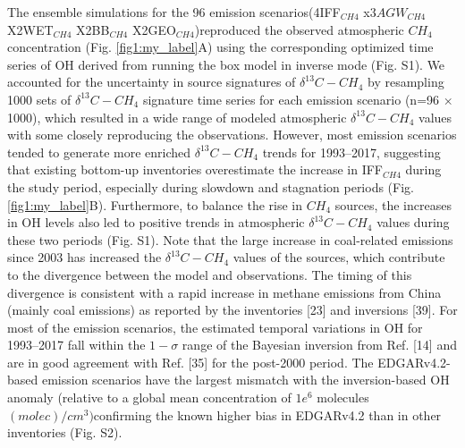 \documentclass[a4paper,12pt]{article}
\begin{document}
\small{The ensemble simulations for the 96 emission scenarios(4IFF$_{CH4}$ x3$AGW_{CH4}$ X2WET$_{CH4}$ X2BB$_{CH4}$ X2GEO$_{CH4}$)reproduced the observed atmospheric $CH_{4}$ concentration (Fig. \ref{fig1:my_label}A) using the corresponding optimized time series of OH derived from running the box model in inverse mode (Fig. S1). We accounted for the uncertainty in source signatures of $\delta^{13}$$C-CH_{4}$ by resampling 1000 sets of $\delta^{13}$$C-CH_{4}$ signature time series for each emission scenario (n=96 × 1000), which resulted in a wide range of modeled atmospheric $\delta^{13}$$C-CH_{4}$ values with some closely reproducing the observations. However, most emission scenarios tended to generate more enriched $\delta^{13}$$C-CH_{4}$ trends for 1993–2017, suggesting that existing bottom-up inventories overestimate the increase in IFF$_{CH4}$ during the study period, especially during slowdown and stagnation periods (Fig. \ref{fig1:my_label}B). Furthermore, to balance the rise in $CH_{4}$ sources, the increases in OH levels also led to positive trends in atmospheric $\delta^{13}$$C-CH_{4}$ values during these two periods (Fig. S1). Note that the large increase in coal-related emissions since 2003 has increased the $\delta^{13}$$C-CH_{4}$ values of the sources, which contribute to the divergence between the model and observations. The timing of this divergence is consistent with a rapid increase in methane emissions from China (mainly coal emissions) as reported by the inventories [23] and inversions [39]. For most of the emission scenarios, the estimated temporal variations in OH for 1993–2017 fall within the $1-\sigma$ range of the Bayesian inversion from Ref. [14] and are in good agreement with Ref. [35] for the post-2000 period. The EDGARv4.2-based emission scenarios have the largest mismatch with the inversion-based OH anomaly (relative to a global mean concentration of $1e^{6}$ molecules $(molec)/cm^{3})$confirming the known higher bias in EDGARv4.2 than in other inventories (Fig. S2).}\\\\
\end{document}
